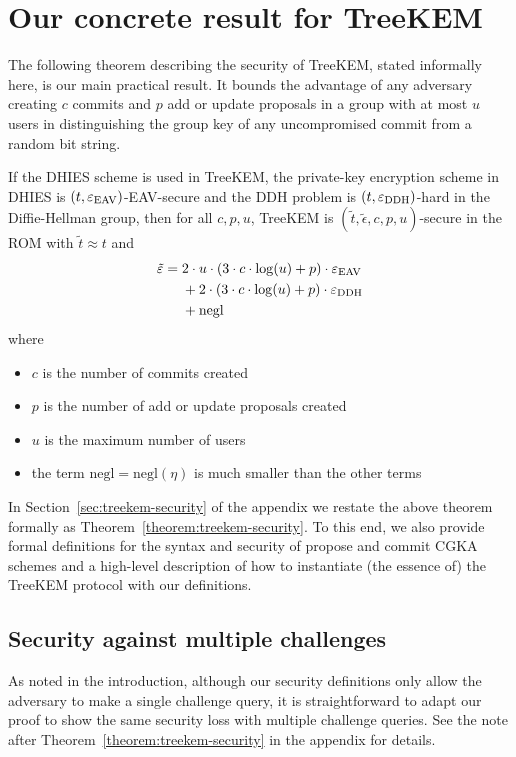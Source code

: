 \section{Our concrete result for TreeKEM}

The following theorem describing the security of TreeKEM, stated informally here, is our main practical result. It bounds the advantage of any adversary creating $c$ commits and $p$ add or update proposals in a group with at most $u$ users in distinguishing the group key of any uncompromised commit from a random bit string.

\begin{theorem}[Informal] \label{theorem:treekem-security-informal}
	If the DHIES scheme is used in TreeKEM, the private-key encryption scheme in DHIES is $(t, \varepsilon_\mathrm{EAV})$-EAV-secure and the DDH problem is $(t, \varepsilon_\mathrm{DDH})$-hard in the Diffie-Hellman group, then for all $c, p, u$, TreeKEM is $(\tilde{t}, \tilde{\epsilon}, c, p, u)$-secure in the ROM with $\tilde{t} \approx t$ and
	\begin{align*}
		\begin{split}
			\tilde{\varepsilon} ={} & 2 \cdot u \cdot (3 \cdot c \cdot \log(u) + p) \cdot \varepsilon_\mathrm{EAV} \\
			& + 2 \cdot (3 \cdot c \cdot \log(u) + p) \cdot \varepsilon_\mathrm{DDH} \\
			& + \mathrm{negl}
		\end{split}
	\end{align*}
	where
	\begin{itemize}
		\item $c$ is the number of commits created
		\item $p$ is the number of add or update proposals created
		\item $u$ is the maximum number of users
		\item the term $\mathrm{negl} = \mathrm{negl}(\eta)$ is much smaller than the other terms
	\end{itemize}
\end{theorem}

In Section~\ref{sec:treekem-security} of the appendix we restate the above theorem formally as Theorem~\ref{theorem:treekem-security}. To this end, we also provide formal definitions for the syntax and security of propose and commit CGKA schemes and a high-level description of how to instantiate (the essence of) the TreeKEM protocol with our definitions.

\subsection{Security against multiple challenges} As noted in the introduction, although our security definitions only allow the adversary to make a single challenge query, it is straightforward to adapt our proof to show the same security loss with multiple challenge queries. See the note after Theorem~\ref{theorem:treekem-security} in the appendix for details.

